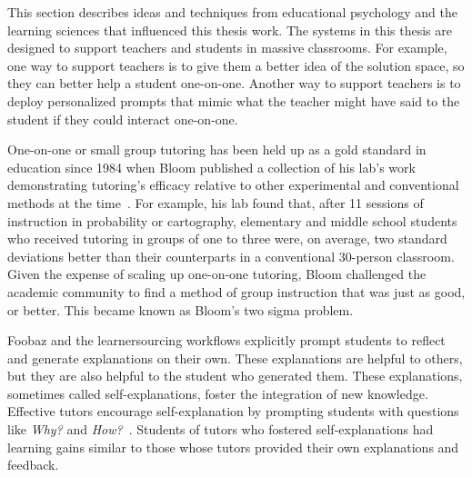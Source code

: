 This section describes ideas and techniques from educational psychology and the learning sciences that influenced this thesis work. The systems in this thesis are designed to support teachers and students in massive classrooms. For example, one way to support teachers is to give them a better idea of the solution space, so they can better help a student one-on-one. Another way to support teachers is to deploy personalized prompts that mimic what the teacher might have said to the student if they could interact one-on-one.

One-on-one or small group tutoring has been held up as a gold standard in education since 1984 when Bloom published a collection of his lab's work demonstrating tutoring's efficacy relative to other experimental and conventional methods at the time~\cite{bloom}. For example, his lab found that, after 11 sessions of instruction in probability or cartography, elementary and middle school students who received tutoring in groups of one to three were, on average, two standard deviations better than their counterparts in a conventional 30-person classroom. Given the expense of scaling up one-on-one tutoring, Bloom challenged the academic community to find a method of group instruction that was just as good, or better. This became known as Bloom's two sigma problem.


Foobaz and the learnersourcing workflows explicitly prompt students to reflect and generate explanations on their own. These explanations are helpful to others, but they are also helpful to the student who generated them. These explanations, sometimes called self-explanations, foster the integration of new knowledge. Effective tutors encourage self-explanation by prompting students with questions like {\it Why?} and {\it How?}~\cite{selfexplanation}. Students of tutors who fostered self-explanations had learning gains similar to those whose tutors provided their own explanations and feedback\cite{chi2001learning}. 

